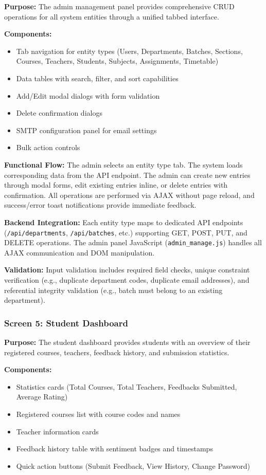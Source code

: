 \textbf{Purpose:}
The admin management panel provides comprehensive CRUD operations for all system entities through a unified tabbed interface.

\textbf{Components:}
\begin{itemize}
    \item Tab navigation for entity types (Users, Departments, Batches, Sections, Courses, Teachers, Students, Subjects, Assignments, Timetable)
    \item Data tables with search, filter, and sort capabilities
    \item Add/Edit modal dialogs with form validation
    \item Delete confirmation dialogs
    \item SMTP configuration panel for email settings
    \item Bulk action controls
\end{itemize}

\textbf{Functional Flow:}
The admin selects an entity type tab. The system loads corresponding data from the API endpoint. The admin can create new entries through modal forms, edit existing entries inline, or delete entries with confirmation. All operations are performed via AJAX without page reload, and success/error toast notifications provide immediate feedback.

\textbf{Backend Integration:}
Each entity type maps to dedicated API endpoints (\texttt{/api/departments}, \texttt{/api/batches}, etc.) supporting GET, POST, PUT, and DELETE operations. The admin panel JavaScript (\texttt{admin\_manage.js}) handles all AJAX communication and DOM manipulation.

\textbf{Validation:}
Input validation includes required field checks, unique constraint verification (e.g., duplicate department codes, duplicate email addresses), and referential integrity validation (e.g., batch must belong to an existing department).



\subsubsection{Screen 5: Student Dashboard}

\textbf{Purpose:}
The student dashboard provides students with an overview of their registered courses, teachers, feedback history, and submission statistics.

\textbf{Components:}
\begin{itemize}
    \item Statistics cards (Total Courses, Total Teachers, Feedbacks Submitted, Average Rating)
    \item Registered courses list with course codes and names
    \item Teacher information cards
    \item Feedback history table with sentiment badges and timestamps
    \item Quick action buttons (Submit Feedback, View History, Change Password)
\end{itemize}

